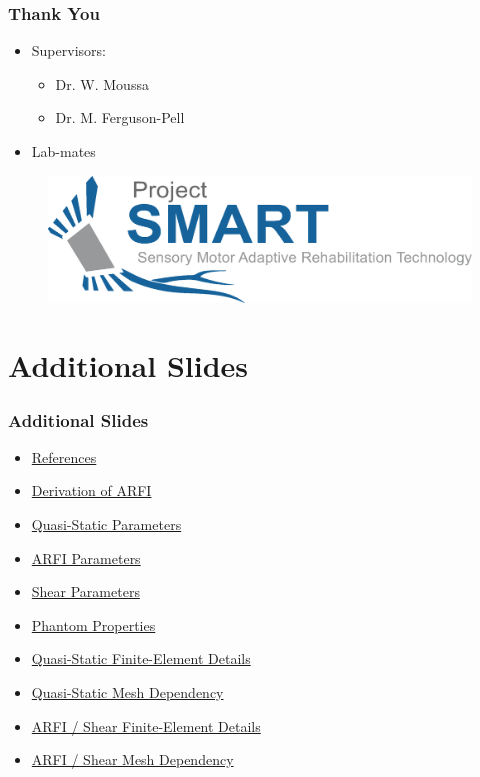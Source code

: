 \documentclass{beamer}
\begin{document}
		\begin{frame}
			\frametitle{Thank You}
			\begin{itemize}
				\item Supervisors:
				\begin{itemize}
					\item Dr. W. Moussa
					\item Dr. M. Ferguson-Pell
				\end{itemize}
				\item Lab-mates
			\end{itemize}
			\begin{figure}
				\includegraphics[width=\textwidth]{assets/SMART.eps}
			\end{figure}
		\end{frame}

	\AtBeginSection{}
	\appendix
	\section{Additional Slides}
	\setcounter{showProgressBar}{0}
	\setcounter{showSlideNumbers}{0}

		\begin{frame}
			\frametitle{Additional Slides}
			\begin{itemize}
				\item \hyperlink{refs}{References}
				\item \hyperlink{arfiForceDerivation}{Derivation of ARFI}
				\item \hyperlink{qsParameters}{Quasi-Static Parameters}
				\item \hyperlink{arfiParameters}{ARFI Parameters}
				\item \hyperlink{shearParameters}{Shear Parameters}
				\item \hyperlink{cirsProperties}{Phantom Properties}
				\item \hyperlink{quasiFEA}{Quasi-Static Finite-Element Details}
				\item \hyperlink{quasiMeshDepend}{Quasi-Static Mesh Dependency}
				\item \hyperlink{arfiFEA}{ARFI / Shear Finite-Element Details}
				\item \hyperlink{arfiMeshDepend}{ARFI / Shear Mesh Dependency}
			\end{itemize}
		\end{frame}
\end{document}
